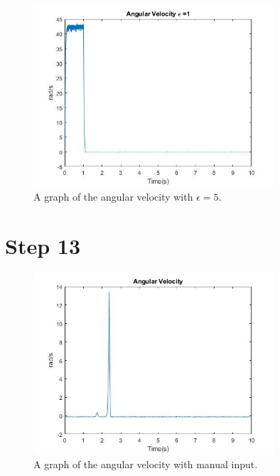 \begin{figure}[H]
	\centering
	\includegraphics[width=0.8\textwidth]{./figures/lab6_angularvelocitye1.jpg}
	\caption{A graph of the angular velocity with $\epsilon = 5$.}
	\label{fig:}
\end{figure}

\section{Step 13}
\begin{figure}[H]
	\centering
 	\includegraphics[width=0.8\textwidth]{./figures/lab6_angularvelocity_manual.jpg}
	\caption{A graph of the angular velocity with manual input.}
	\label{fig:}
\end{figure}

